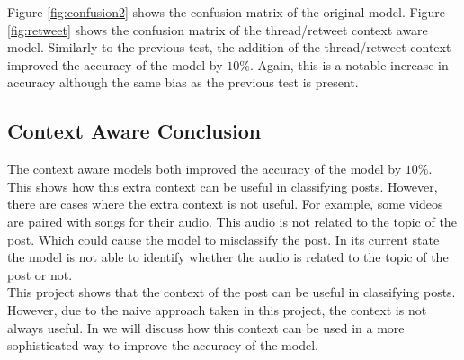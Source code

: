 Figure \ref{fig:confusion2} shows the confusion matrix of the original model. Figure \ref{fig:retweet} shows the confusion matrix of the
thread/retweet context aware model. Similarly to the previous test, the addition of the thread/retweet context improved the accuracy of
the model by $10\%$. Again, this is a notable increase in accuracy although the same bias as the previous test is present.

\subsection{Context Aware Conclusion}
The context aware models both improved the accuracy of the model by $10\%$. This shows how this extra context can be useful in
classifying posts. However, there are cases where the extra context is not useful. For example, some videos are paired with songs for
their audio. This audio is not related to the topic of the post. Which could cause the model to misclassify the post. In its current state
the model is not able to identify whether the audio is related to the topic of the post or not.\\
This project shows that the context of the post can be useful in classifying posts. However, due to the naive approach taken
in this project, the context is not always useful. In  we will discuss how this context can be used in a more
sophisticated way to improve the accuracy of the model.